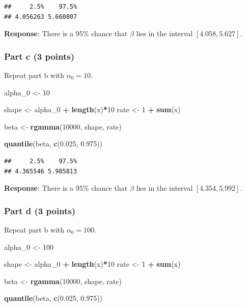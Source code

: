 \documentclass[
]{article}
\newenvironment{Shaded}{\begin{snugshade}}{\end{snugshade}}
\newcommand{\DecValTok}[1]{\textcolor[rgb]{0.00,0.00,0.81}{#1}}
\newcommand{\FloatTok}[1]{\textcolor[rgb]{0.00,0.00,0.81}{#1}}
\newcommand{\FunctionTok}[1]{\textcolor[rgb]{0.13,0.29,0.53}{\textbf{#1}}}
\newcommand{\NormalTok}[1]{#1}
\newcommand{\OtherTok}[1]{\textcolor[rgb]{0.56,0.35,0.01}{#1}}
\newcommand{\SpecialCharTok}[1]{\textcolor[rgb]{0.81,0.36,0.00}{\textbf{#1}}}
\begin{document}
\begin{verbatim}
##     2.5%    97.5% 
## 4.056263 5.660807
\end{verbatim}

\textbf{Response}: There is a \(95\%\) chance that \(\beta\) lies in the
interval \([4.058, 5.627]\).

\hypertarget{part-c-3-points-1}{%
\subsubsection{Part c (3 points)}\label{part-c-3-points-1}}

Repeat part b with \(\alpha_0 = 10\).

\begin{Shaded}
\begin{Highlighting}[]
\NormalTok{alpha\_0 }\OtherTok{\textless{}{-}} \DecValTok{10}

\NormalTok{shape }\OtherTok{\textless{}{-}}\NormalTok{ alpha\_0 }\SpecialCharTok{+} \FunctionTok{length}\NormalTok{(x)}\SpecialCharTok{*}\DecValTok{10}
\NormalTok{rate }\OtherTok{\textless{}{-}} \DecValTok{1} \SpecialCharTok{+} \FunctionTok{sum}\NormalTok{(x)}

\NormalTok{beta }\OtherTok{\textless{}{-}} \FunctionTok{rgamma}\NormalTok{(}\DecValTok{10000}\NormalTok{, shape, rate)}

\FunctionTok{quantile}\NormalTok{(beta, }\FunctionTok{c}\NormalTok{(}\FloatTok{0.025}\NormalTok{, }\FloatTok{0.975}\NormalTok{))}
\end{Highlighting}
\end{Shaded}

\begin{verbatim}
##     2.5%    97.5% 
## 4.365546 5.985813
\end{verbatim}

\textbf{Response}: There is a \(95\%\) chance that \(\beta\) lies in the
interval \([4.354, 5.992]\).

\hypertarget{part-d-3-points}{%
\subsubsection{Part d (3 points)}\label{part-d-3-points}}

Repeat part b with \(\alpha_0 = 100\).

\begin{Shaded}
\begin{Highlighting}[]
\NormalTok{alpha\_0 }\OtherTok{\textless{}{-}} \DecValTok{100}

\NormalTok{shape }\OtherTok{\textless{}{-}}\NormalTok{ alpha\_0 }\SpecialCharTok{+} \FunctionTok{length}\NormalTok{(x)}\SpecialCharTok{*}\DecValTok{10}
\NormalTok{rate }\OtherTok{\textless{}{-}} \DecValTok{1} \SpecialCharTok{+} \FunctionTok{sum}\NormalTok{(x)}

\NormalTok{beta }\OtherTok{\textless{}{-}} \FunctionTok{rgamma}\NormalTok{(}\DecValTok{10000}\NormalTok{, shape, rate)}

\FunctionTok{quantile}\NormalTok{(beta, }\FunctionTok{c}\NormalTok{(}\FloatTok{0.025}\NormalTok{, }\FloatTok{0.975}\NormalTok{))}
\end{Highlighting}
\end{Shaded}
\end{document}

